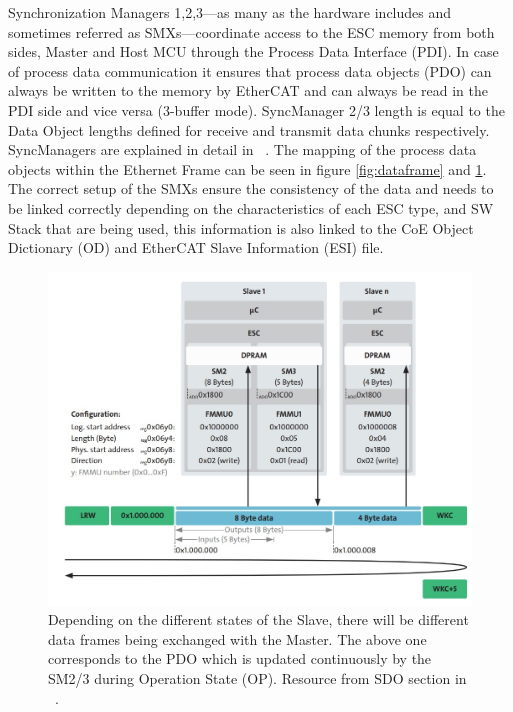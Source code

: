 Synchronization Managers 1,2,3---as many as the hardware includes and sometimes referred as SMXs---coordinate access to the ESC 
memory from both sides, Master and
Host MCU through the Process Data Interface (PDI). In case of process data communication it ensures that process data objects (PDO) 
can
always be written to the memory by EtherCAT and can always be read in the PDI side and vice versa (3-buffer mode). 
SyncManager 2/3 length is equal
to the Data Object lengths defined for receive and transmit data chunks respectively. SyncManagers are explained in detail in ~\cite{beckhoff_datalink}. %
The mapping of the process data objects within the Ethernet Frame can be seen in figure \ref{fig:dataframe} and \ref{fig:pdomapping}.
The correct setup of the SMXs ensure the consistency of the data and needs to be linked correctly depending on the characteristics of each ESC type,
 and SW Stack that are being used, this information is also linked to the CoE Object Dictionary (OD) and EtherCAT Slave Information (ESI) file.
\begin{figure}[ht]
    \centering
    \includegraphics[width=.85\textwidth]{imgs/impl-dataframe_pdo.jpg}
    \caption{Depending on the different states of the Slave, there will be different data frames being exchanged with the Master. 
    The above one corresponds to the PDO which is updated continuously by the SM2/3 during Operation State (OP). Resource from SDO section in ~\cite{beckhoff_applayer}.}
    \label{fig:pdomapping}
\end{figure}